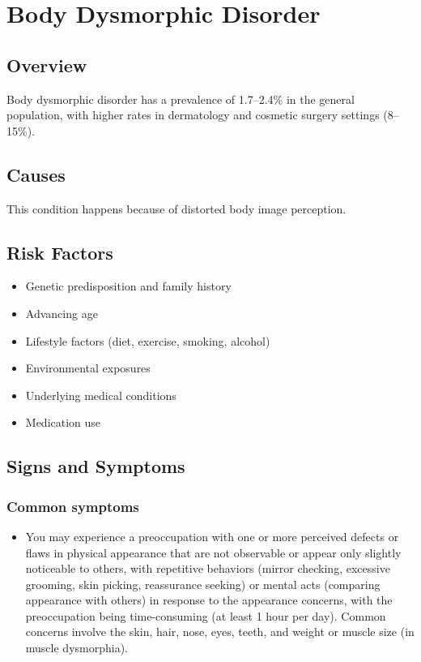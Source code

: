 \chapter{Body Dysmorphic Disorder}
\label{sec:Body Dysmorphic Disorder}

\section{Overview}
Body dysmorphic disorder has a prevalence of 1.7--2.4\% in the general population, with higher rates in dermatology and cosmetic surgery settings (8--15\%).
\section{Causes}
This condition happens because of distorted body image perception.     
\section{Risk Factors}

\begin{itemize}[noitemsep]
  \item Genetic predisposition and family history
  \item Advancing age
  \item Lifestyle factors (diet, exercise, smoking, alcohol)
  \item Environmental exposures
  \item Underlying medical conditions
  \item Medication use
\end{itemize}
\section{Signs and Symptoms}

\subsection{Common symptoms}
\begin{itemize}[noitemsep]
  \item You may experience a preoccupation with one or more perceived defects or flaws in physical appearance that are not observable or appear only slightly noticeable to others, with repetitive behaviors (mirror checking, excessive grooming, skin picking, reassurance seeking) or mental acts (comparing appearance with others) in response to the appearance concerns, with the preoccupation being time-consuming (at least 1 hour per day). Common concerns involve the skin, hair, nose, eyes, teeth, and weight or muscle size (in muscle dysmorphia). 
  \end{itemize}

